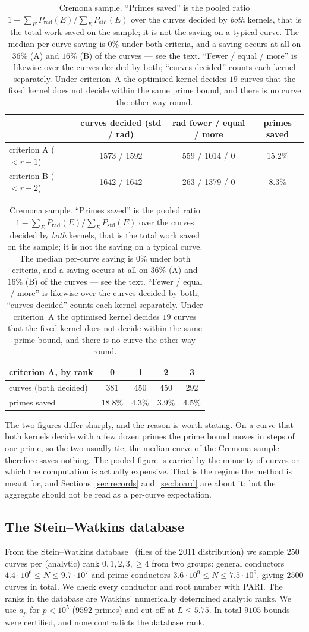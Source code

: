 \documentclass[11pt]{amsart}
\theoremstyle{remark}
\theoremstyle{definition}
\begin{document}
\begin{table}[h]
\centering\small
\begin{tabular}{lccc}
\toprule
 & curves decided (std / rad) & rad fewer / equal / more & primes saved\\
\midrule
criterion A ($<r+1$) & 1573 / 1592 & 559 / 1014 / 0 & 15.2\%\\
criterion B ($<r+2$) & 1642 / 1642 & 263 / 1379 / 0 & \phantom{1}8.3\%\\
\bottomrule
\end{tabular}

\smallskip
\begin{tabular}{lcccc}
\toprule
criterion A, by rank & 0 & 1 & 2 & 3\\
\midrule
curves (both decided) & 381 & 450 & 450 & 292\\
primes saved & 18.8\% & 4.3\% & 3.9\% & 4.5\%\\
\bottomrule
\end{tabular}
\caption{Cremona sample. ``Primes saved'' is the pooled ratio
$1-\sum_E P_{\mathrm{rad}}(E)/\sum_E P_{\mathrm{std}}(E)$ over the curves decided by \emph{both}
kernels, that is the total work saved on the sample; it is not the saving on a typical curve. The
median per-curve saving is $0\%$ under both criteria, and a saving occurs at all on $36\%$ (A) and
$16\%$ (B) of the curves --- see the text. ``Fewer / equal / more'' is likewise over the curves
decided by both; ``curves decided'' counts each kernel separately. Under criterion~A the optimised
kernel decides $19$ curves that the fixed kernel does not decide within the same prime bound, and
there is no curve the other way round.}
\label{tab:cremona}
\end{table}

The two figures differ sharply, and the reason is worth stating. On a curve that both kernels
decide with a few dozen primes the prime bound moves in steps of one prime, so the two usually tie;
the median curve of the Cremona sample therefore saves nothing. The pooled figure is carried by the
minority of curves on which the computation is actually expensive. That is the regime the method is
meant for, and Sections~\ref{sec:records} and~\ref{sec:board} are about it; but the aggregate should
not be read as a per-curve expectation.

\subsection{The Stein--Watkins database}
From the Stein--Watkins database~\cite{SW} (files of the 2011 distribution) we sample $250$ curves per (analytic) rank $0,1,2,3,\ge4$ from two groups: general conductors $4.4\cdot10^6\le N\le9.7\cdot10^7$ and prime conductors $3.6\cdot10^9\le N\le7.5\cdot10^9$, giving $2500$ curves in total. We check every conductor and root number with PARI. The ranks in the database are Watkins' numerically determined analytic ranks. We use $a_p$ for $p<10^5$ ($9592$ primes) and cut off at $L\le5.75$. In total $9105$ bounds were certified, and none contradicts the database rank.
\end{document}
